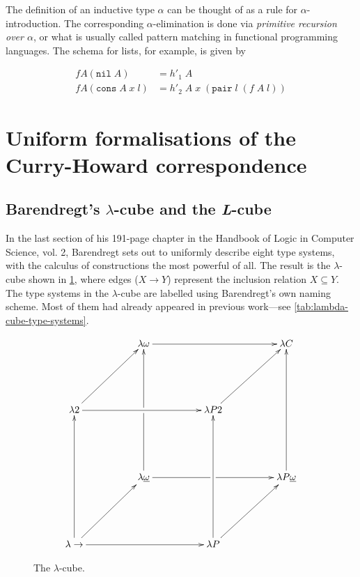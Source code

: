 \documentclass[12pt,toc=bibliography,numbers=noendperiod,
               footnotes=multiple,twoside]{scrartcl}
\begin{document}
The definition of an inductive type \(\alpha\) can be thought of as a rule for \(\alpha\)-introduction. The corresponding \(\alpha\)-elimination is done via \emph{primitive recursion over \(\alpha\)}, or what is usually called pattern matching in functional programming languages. The schema for lists, for example, is given by

\begin{align*}
f A (\texttt{nil}\;A) &= h'_1\;A \\
f A (\texttt{cons}\;A\;x\;l) &= h'_2\;A\;x\;(\texttt{pair}\;l\;(f\;A\;l))
\end{align*}


\section{Uniform formalisations of the Curry-Howard correspondence}

\subsection{Barendregt's \(\lambda\)-cube and the \emph{L}-cube}

In the last section of his 191-page chapter  in the Handbook of Logic in Computer Science, vol. 2, Barendregt sets out to uniformly describe eight type systems, with the calculus of constructions the most powerful of all. The result is the \(\lambda\)-cube shown in \cref{fig:lambda-cube}, where edges (\(X \longrightarrow Y\)) represent the inclusion relation \(X \subseteq Y\). The type systems in the \(\lambda\)-cube are labelled using Barendregt's own naming scheme. Most of them had already appeared in previous work---see \cref{tab:lambda-cube-type-systems}.

\begin{figure}
\begin{equation*}
\xymatrix@R55pt@C50pt{%
&\lambda\omega\ar@{->}[rr]&&\lambda C \\
\lambda 2\ar@{->}[rr]\ar@{->}[ur]&&\lambda P2\ar@{->}[ur] \\
&\lambda\underline{\omega}\ar@{->}[uu]|!{"2,1";"2,3"}\hole\ar@{->}[rr]|!{"4,3";"2,3"}\hole&&\lambda P\underline{\omega}\ar@{->}[uu] \\
\lambda\rightarrow\ar@{->}[uu]\ar@{->}[rr]\ar@{->}[ur]&&\lambda P\ar@{->}[uu]\ar@{->}[ur]
}
\end{equation*}
\caption{The \(\lambda\)-cube.}
\label{fig:lambda-cube}
\end{figure}
\end{document}
